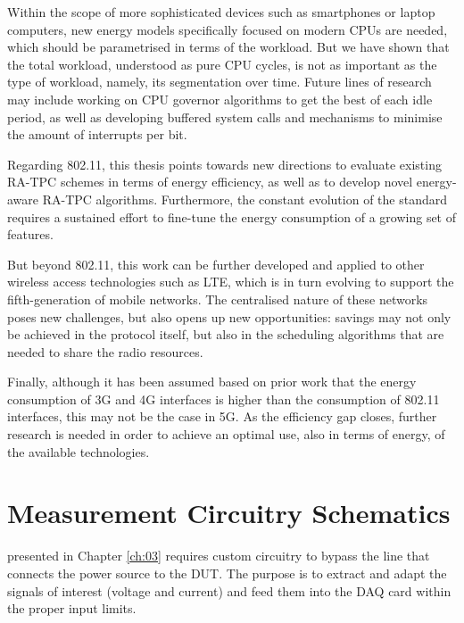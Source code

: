 \documentclass[twoside,nohyper]{tufte-book}
\begin{document}
Within the scope of more sophisticated devices such as smartphones or laptop computers, new energy models specifically focused on modern CPUs are needed, which should be parametrised in terms of the workload. But we have shown that the total workload, understood as pure CPU cycles, is not as important as the type of workload, namely, its segmentation over time. Future lines of research may include working on CPU governor algorithms to get the best of each idle period, as well as developing buffered system calls and mechanisms to minimise the amount of interrupts per bit.

Regarding 802.11, this thesis points towards new directions to evaluate existing RA-TPC schemes in terms of energy efficiency, as well as to develop novel energy-aware RA-TPC algorithms. Furthermore, the constant evolution of the standard requires a sustained effort to fine-tune the energy consumption of a growing set of features.

But beyond 802.11, this work can be further developed and applied to other wireless access technologies such as LTE, which is in turn evolving to support the fifth-generation of mobile networks. The centralised nature of these networks poses new challenges, but also opens up new opportunities: savings may not only be achieved in the protocol itself, but also in the scheduling algorithms that are needed to share the radio resources.

Finally, although it has been assumed based on prior work that the energy consumption of 3G and 4G interfaces is higher than the consumption of 802.11 interfaces, this may not be the case in 5G. As the efficiency gap closes, further research is needed in order to achieve an optimal use, also in terms of energy, of the available technologies.

\hypertarget{appendix-appendix}{%
\appendix}


\hypertarget{measurement-circuitry-schematics}{%
\chapter{Measurement Circuitry Schematics}\label{measurement-circuitry-schematics}}

 presented in Chapter \ref{ch:03} requires custom circuitry to bypass the line that connects the power source to the DUT. The purpose is to extract and adapt the signals of interest (voltage and current) and feed them into the DAQ card within the proper input limits.
\end{document}
